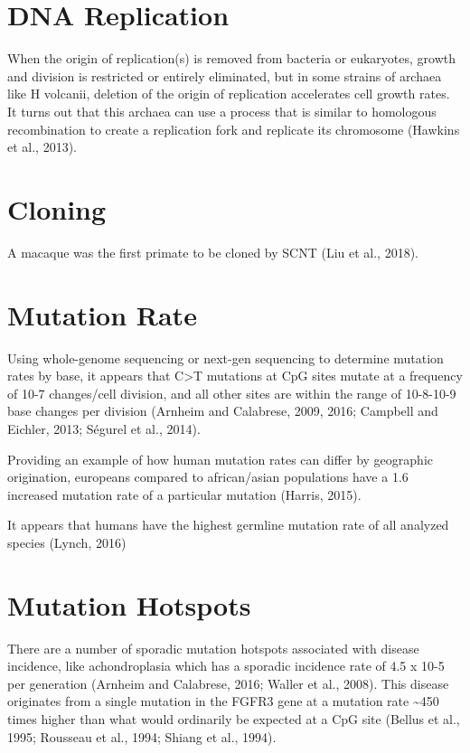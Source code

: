 \documentclass[]{book}
\begin{document}
\hypertarget{dna-replication}{%
\section{DNA Replication}\label{dna-replication}}

When the origin of replication(s) is removed from bacteria or eukaryotes, growth and division is restricted or entirely eliminated, but in some strains of archaea like H volcanii, deletion of the origin of replication accelerates cell growth rates. It turns out that this archaea can use a process that is similar to homologous recombination to create a replication fork and replicate its chromosome (Hawkins et al., 2013).

\hypertarget{cloning}{%
\section{Cloning}\label{cloning}}

A macaque was the first primate to be cloned by SCNT (Liu et al., 2018).

\hypertarget{mutation-rate}{%
\section{Mutation Rate}\label{mutation-rate}}

Using whole-genome sequencing or next-gen sequencing to determine mutation rates by base, it appears that C\textgreater{}T mutations at CpG sites mutate at a frequency of 10-7 changes/cell division, and all other sites are within the range of 10-8-10-9 base changes per division (Arnheim and Calabrese, 2009, 2016; Campbell and Eichler, 2013; Ségurel et al., 2014).

Providing an example of how human mutation rates can differ by geographic origination, europeans compared to african/asian populations have a 1.6 increased mutation rate of a particular mutation (Harris, 2015).

It appears that humans have the highest germline mutation rate of all analyzed species (Lynch, 2016)

\hypertarget{mutation-hotspots}{%
\section{Mutation Hotspots}\label{mutation-hotspots}}

There are a number of sporadic mutation hotspots associated with disease incidence, like achondroplasia which has a sporadic incidence rate of 4.5 x 10-5 per generation (Arnheim and Calabrese, 2016; Waller et al., 2008). This disease originates from a single mutation in the FGFR3 gene at a mutation rate \textasciitilde{}450 times higher than what would ordinarily be expected at a CpG site (Bellus et al., 1995; Rousseau et al., 1994; Shiang et al., 1994).
\end{document}
